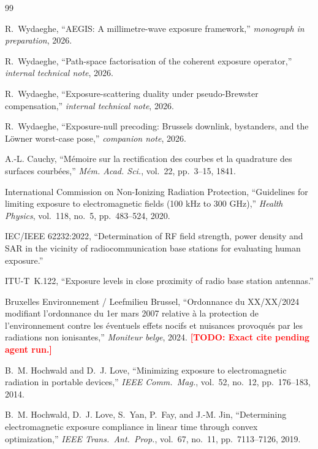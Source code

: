 \documentclass[journal,twoside,onecolumn]{IEEEtran}
\theoremstyle{definition}
\newcommand{\TODO}[1]{\textcolor{red}{\textbf{[TODO: #1]}}}
\begin{document}
\begin{thebibliography}{99}

R.~Wydaeghe, ``AEGIS: A millimetre-wave exposure framework,''
\emph{monograph in preparation}, 2026.

R.~Wydaeghe, ``Path-space factorisation of the coherent exposure
operator,'' \emph{internal technical note}, 2026.

R.~Wydaeghe, ``Exposure-scattering duality under pseudo-Brewster
compensation,'' \emph{internal technical note}, 2026.

R.~Wydaeghe, ``Exposure-null precoding: Brussels downlink,
bystanders, and the Löwner worst-case pose,'' \emph{companion
note}, 2026.

A.-L. Cauchy, ``Mémoire sur la rectification des courbes et la
quadrature des surfaces courbées,'' \emph{Mém. Acad. Sci.}, vol.\
22, pp.~3--15, 1841.

International Commission on Non-Ionizing Radiation Protection,
``Guidelines for limiting exposure to electromagnetic fields (100
kHz to 300 GHz),'' \emph{Health Physics}, vol.~118, no.~5,
pp.~483--524, 2020.

IEC/IEEE 62232:2022, ``Determination of RF field strength, power
density and SAR in the vicinity of radiocommunication base
stations for evaluating human exposure.''

ITU-T~K.122, ``Exposure levels in close proximity of radio base
station antennas.''

Bruxelles Environnement / Leefmilieu Brussel, ``Ordonnance du XX/XX/2024
modifiant l'ordonnance du 1er mars 2007 relative à la protection de
l'environnement contre les éventuels effets nocifs et nuisances
provoqués par les radiations non ionisantes,'' \emph{Moniteur
belge}, 2024. \TODO{Exact cite pending agent run.}

B.~M. Hochwald and D.~J. Love, ``Minimizing exposure to
electromagnetic radiation in portable devices,'' \emph{IEEE Comm.\
Mag.}, vol.~52, no.~12, pp.~176--183, 2014.

B.~M. Hochwald, D.~J. Love, S.~Yan, P.~Fay, and J.-M. Jin,
``Determining electromagnetic exposure compliance in linear time
through convex optimization,'' \emph{IEEE Trans.\ Ant.\ Prop.},
vol.~67, no.~11, pp.~7113--7126, 2019.


\end{thebibliography}
\end{document}
